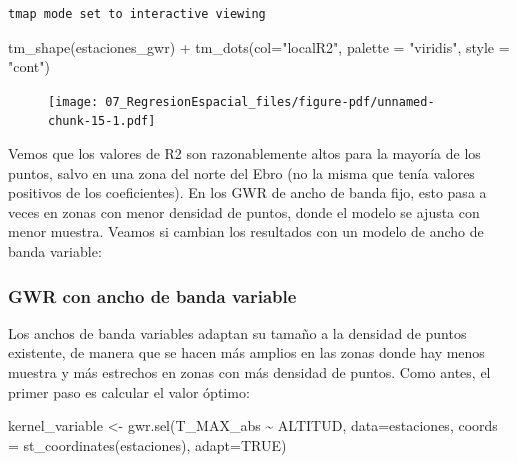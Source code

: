 \documentclass[
  letterpaper,
  DIV=11,
  numbers=noendperiod]{scrreprt}
\newenvironment{Shaded}{\begin{snugshade}}{\end{snugshade}}
\newcommand{\AttributeTok}[1]{\textcolor[rgb]{0.40,0.45,0.13}{#1}}
\newcommand{\ConstantTok}[1]{\textcolor[rgb]{0.56,0.35,0.01}{#1}}
\newcommand{\FunctionTok}[1]{\textcolor[rgb]{0.28,0.35,0.67}{#1}}
\newcommand{\NormalTok}[1]{\textcolor[rgb]{0.00,0.23,0.31}{#1}}
\newcommand{\OtherTok}[1]{\textcolor[rgb]{0.00,0.23,0.31}{#1}}
\newcommand{\SpecialCharTok}[1]{\textcolor[rgb]{0.37,0.37,0.37}{#1}}
\newcommand{\StringTok}[1]{\textcolor[rgb]{0.13,0.47,0.30}{#1}}
\begin{document}
\begin{verbatim}
tmap mode set to interactive viewing
\end{verbatim}

\begin{Shaded}
\begin{Highlighting}[]
\FunctionTok{tm\_shape}\NormalTok{(estaciones\_gwr) }\SpecialCharTok{+}
    \FunctionTok{tm\_dots}\NormalTok{(}\AttributeTok{col=}\StringTok{"localR2"}\NormalTok{, }\AttributeTok{palette =} \StringTok{"viridis"}\NormalTok{, }\AttributeTok{style =} \StringTok{"cont"}\NormalTok{)}
\end{Highlighting}
\end{Shaded}

\begin{figure}[H]

{\centering \texttt{[image: 07\_RegresionEspacial\_files/figure-pdf/unnamed-chunk-15-1.pdf]}

}

\end{figure}

Vemos que los valores de R2 son razonablemente altos para la mayoría de
los puntos, salvo en una zona del norte del Ebro (no la misma que tenía
valores positivos de los coeficientes). En los GWR de ancho de banda
fijo, esto pasa a veces en zonas con menor densidad de puntos, donde el
modelo se ajusta con menor muestra. Veamos si cambian los resultados con
un modelo de ancho de banda variable:

\hypertarget{gwr-con-ancho-de-banda-variable}{%
\subsubsection{GWR con ancho de banda
variable}\label{gwr-con-ancho-de-banda-variable}}

Los anchos de banda variables adaptan su tamaño a la densidad de puntos
existente, de manera que se hacen más amplios en las zonas donde hay
menos muestra y más estrechos en zonas con más densidad de puntos. Como
antes, el primer paso es calcular el valor óptimo:

\begin{Shaded}
\begin{Highlighting}[]
\NormalTok{kernel\_variable }\OtherTok{\textless{}{-}} \FunctionTok{gwr.sel}\NormalTok{(T\_MAX\_abs }\SpecialCharTok{\textasciitilde{}}\NormalTok{ ALTITUD, }\AttributeTok{data=}\NormalTok{estaciones, }
                           \AttributeTok{coords =} \FunctionTok{st\_coordinates}\NormalTok{(estaciones),}
                           \AttributeTok{adapt=}\ConstantTok{TRUE}\NormalTok{) }
\end{Highlighting}
\end{Shaded}
\end{document}
